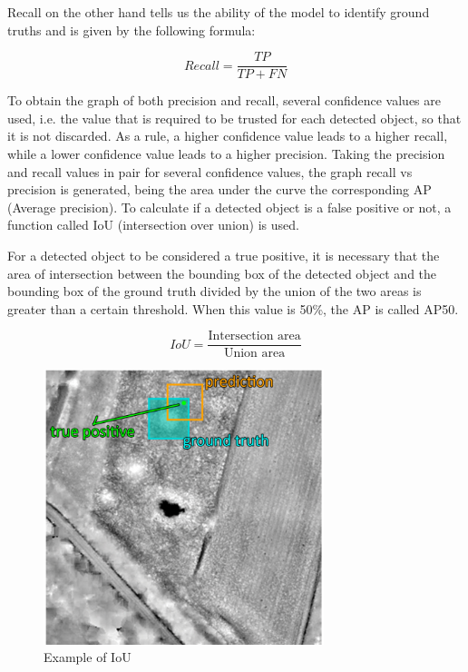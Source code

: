 Recall on the other hand tells us the ability of the model to identify ground truths and is given by the following formula:

\begin{equation}
     Recall = \frac{TP }{TP + FN}
\end{equation}

To obtain the graph of both precision and recall, several confidence values are used, i.e. the value that is required to be trusted for each detected object, so that it is not discarded. As a rule, a higher confidence value leads to a higher recall, while a lower confidence value leads to a higher precision. Taking the precision and recall values in pair for several confidence values, the graph recall vs precision is generated, being the area under the curve the corresponding AP (Average precision). To calculate if a detected object is a false positive or not, a function called IoU (intersection over union) is used.

For a detected object to be considered a true positive, it is necessary that the area of intersection between the bounding box of the detected object and the bounding box of the ground truth divided by the union of the two areas is greater than a certain threshold. When this value is 50\%, the AP is called AP50.

\begin{equation}
     IoU = \frac{\text{Intersection area}}{\text{Union area}}
\end{equation}

\begin{figure}[H]
\centering
\includegraphics[height=8cm]{images/IOU.png}
\caption[Example of IoU]{Example of IoU \cite{IOUpaper}}
\end{figure}

